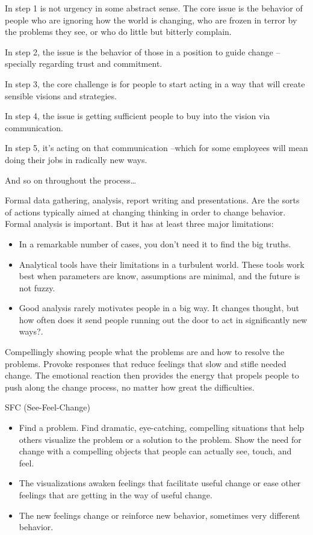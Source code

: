 \documentclass[english,14pt,a4paper,final,oneside]{article}
\begin{document}
In step 1 is not urgency in some abstract sense. The core issue is the behavior of people who are ignoring how the world is changing, who are frozen in terror by the problems they see, or who do little but bitterly complain.

In step 2, the issue is the behavior of those in a position to guide change --specially regarding trust and commitment.

In step 3, the core challenge is for people to start acting in a way that will create sensible visions and strategies.

In step 4, the issue is getting sufficient people to buy into the vision via communication.

In step 5, it's acting on that communication --which for some employees will mean doing their jobs in radically new ways.

And so on throughout the process\ldots


\vspace{1.5cm}


Formal data gathering, analysis, report writing and presentations. Are the sorts of actions typically aimed at changing thinking in order to change behavior.
\\Formal analysis is important. But it has at least three major limitations:
\begin{itemize}
\item In a remarkable number of cases, you don't need it to find the big truths.
\item Analytical tools have their limitations in a turbulent world. These tools work best when parameters are know, assumptions are minimal, and the future is not fuzzy.
\item Good analysis rarely motivates people in a big way. It changes thought, but how often does it send people running out the door to act in significantly new ways?.
\end{itemize}

\vspace{0.6cm}

Compellingly showing people what the problems are and how to resolve the problems. Provoke responses that reduce feelings that slow and stifle needed change. The emotional reaction then provides the energy that propels people to push along the change process, no matter how great the difficulties.

SFC (See-Feel-Change)
\begin{itemize}
\item Find a problem. Find dramatic, eye-catching, compelling situations that help others visualize the problem or a solution to the problem. Show the need for change with a compelling objects that people can actually see, touch, and feel.
\item The visualizations awaken feelings that facilitate useful change or ease other feelings that are getting in the way of useful change.
\item The new feelings change or reinforce new behavior, sometimes very different behavior.
\end{itemize}
\end{document}

